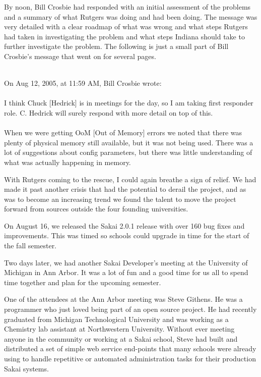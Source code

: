 \documentclass[12pt]{book}
\begin{document}
By noon, Bill Crosbie had responded with an initial
assessment of the problems and a summary of what
Rutgers was doing and had been doing.
The message was very detailed with
a clear roadmap of what was wrong and what steps
Rutgers had taken in investigating the problem
and what steps Indiana should take to further
investigate the problem.  The following is just a
small part of Bill Crosbie's message that went on
for several pages.\\
\\
\begin{sf}
On Aug 12, 2005, at 11:59 AM, Bill Crosbie wrote:\\
\\
I think Chuck [Hedrick] is in meetings for the day,
so I am taking first responder role.  C. Hedrick will
surely respond with more detail on top of this.\\
\\
When we were getting OoM [Out of Memory] errors we
noted that there was plenty of physical memory still
available, but it was not being used.  There was a
lot of suggestions about config parameters, but there
was little understanding of what was actually
happening in memory.\\
\end{sf}

With Rutgers coming to the rescue, I could again breathe
a sign of relief.  We had made it past another
crisis that had the potential
to derail the project, and as was to become an increasing
trend we found the talent to move the project forward
from sources outside the four founding universities.

On August 16, we released the Sakai 2.0.1 release
with over 160 bug fixes and improvements.  This was
timed so schools could upgrade in time for the start
of the fall semester.

Two days later, we had another Sakai Developer's meeting
at the University of Michigan in Ann Arbor.  It was a
lot of fun and a good time for us all to spend
time together and plan for the upcoming semester.

One of the attendees at the Ann Arbor meeting
was Steve Githens.  He was a
programmer who just loved being part of an open
source project.  He had recently graduated
from Michigan Technological University and was working
as a Chemistry lab assistant at Northwestern University.
Without ever meeting anyone in the community or working
at a Sakai school,
Steve had built and distributed a set of simple
web service end-points that many schools
were already using to
handle repetitive or automated administration tasks
for their production Sakai systems.
\end{document}

